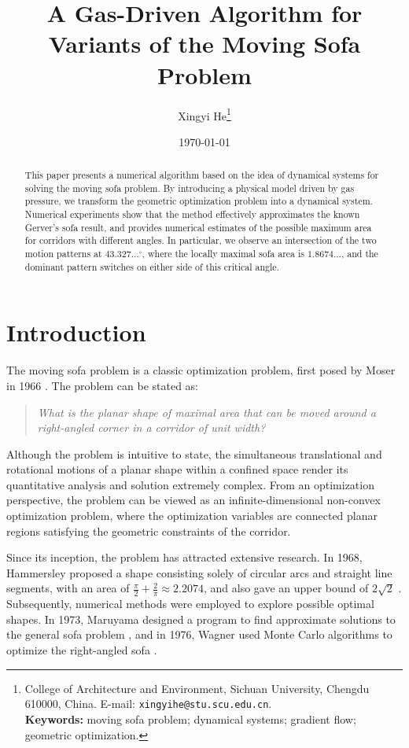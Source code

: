 \documentclass[12pt,a4paper]{article}
\title{\textbf{A Gas-Driven Algorithm for Variants of the Moving Sofa Problem}}
\author{Xingyi He\thanks{
College of Architecture and Environment, Sichuan University,
Chengdu 610000, China.
E-mail: \texttt{xingyihe@stu.scu.edu.cn}.\\
\textbf{Keywords:} moving sofa problem; dynamical systems; gradient flow; geometric optimization.
}}
\date{\today}
\theoremstyle{remark} %
\begin{document}
\maketitle

\begin{abstract}
This paper presents a numerical algorithm based on the idea of dynamical systems for solving the moving sofa problem. 
By introducing a physical model driven by gas pressure, 
we transform the geometric optimization problem into a dynamical system. 
Numerical experiments show that the method effectively approximates the known Gerver's sofa result, 
and provides numerical estimates of the possible maximum area for corridors with different angles. 
In particular, we observe an intersection of the two motion patterns at $43.327\ldots^\circ$, 
where the locally maximal sofa area is $1.8674\ldots$, 
and the dominant pattern switches on either side of this critical angle.
\end{abstract}


\section{Introduction}

The moving sofa problem is a classic optimization problem, first posed by Moser in 1966 \cite{Moser1966}. The problem can be stated as:

\begin{quote}
\textit{What is the planar shape of maximal area that can be moved around a right-angled corner in a corridor of unit width?}
\end{quote}

Although the problem is intuitive to state, the simultaneous translational and rotational motions of a planar shape within a confined space render its quantitative analysis and solution extremely complex. From an optimization perspective, the problem can be viewed as an infinite-dimensional non-convex optimization problem, where the optimization variables are connected planar regions satisfying the geometric constraints of the corridor.

Since its inception, the problem has attracted extensive research. In 1968, Hammersley proposed a shape consisting solely of circular arcs and straight line segments, with an area of $\frac{\pi}{2} + \frac{2}{\pi} \approx 2.2074$, and also gave an upper bound of $2\sqrt{2}$ \cite{Hammersley1968}. Subsequently, numerical methods were employed to explore possible optimal shapes. In 1973, Maruyama designed a program to find approximate solutions to the general sofa problem \cite{Maruyama1973}, and in 1976, Wagner used Monte Carlo algorithms to optimize the right-angled sofa \cite{Wagner1976}.
\end{document}
